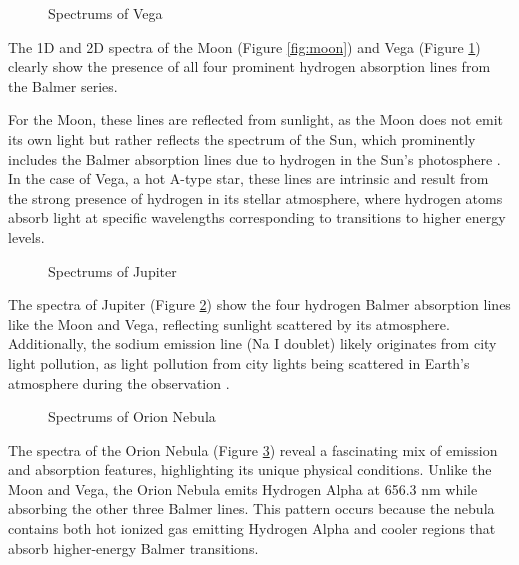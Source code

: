 \documentclass[10pt, preprint]{aastex}
\begin{document}
\begin{figure}[H]
  \centering
  \hfill
  \caption{\label{fig:vega}Spectrums of Vega}
\end{figure}

The 1D and 2D spectra of the Moon (Figure \ref{fig:moon}) and Vega (Figure \ref{fig:vega}) clearly show the presence of all four prominent hydrogen absorption lines from the Balmer series.

For the Moon, these lines are reflected from sunlight, as the Moon does not emit its own light but rather reflects the spectrum of the Sun, which prominently includes the Balmer absorption lines due to hydrogen in the Sun’s photosphere \cite{ast325lecture11}. In the case of Vega, a hot A-type star, these lines are intrinsic and result from the strong presence of hydrogen in its stellar atmosphere, where hydrogen atoms absorb light at specific wavelengths corresponding to transitions to higher energy levels.

\begin{figure}[H]
  \centering
  \hfill
  \caption{\label{fig:jup}Spectrums of Jupiter}
\end{figure}

The spectra of Jupiter (Figure \ref{fig:jup}) show the four hydrogen Balmer absorption lines like the Moon and Vega, reflecting sunlight scattered by its atmosphere. Additionally, the sodium emission line (Na I doublet) likely originates from city light pollution, as light pollution from city lights being scattered in Earth's atmosphere during the observation \cite{lamptech}.

\begin{figure}[H]
  \centering
  \hfill
  \caption{\label{fig:orion}Spectrums of Orion Nebula}
\end{figure}

The spectra of the Orion Nebula (Figure \ref{fig:orion}) reveal a fascinating mix of emission and absorption features, highlighting its unique physical conditions. Unlike the Moon and Vega, the Orion Nebula emits Hydrogen Alpha at 656.3 nm while absorbing the other three Balmer lines. This pattern occurs because the nebula contains both hot ionized gas emitting Hydrogen Alpha and cooler regions that absorb higher-energy Balmer transitions.
\end{document}
